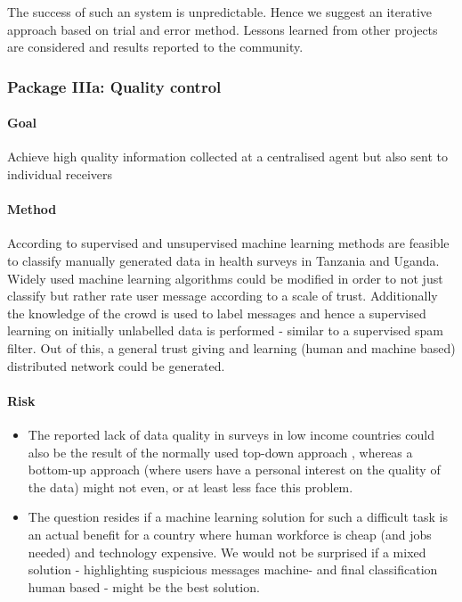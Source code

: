 \documentclass[11pt]{article}
\begin{document}
The success of such an system is unpredictable. Hence we suggest an iterative approach based on trial and error method. Lessons learned from other projects are considered and results reported to the community.



\subsubsection*{Package IIIa: Quality control}
\paragraph{Goal} Achieve high quality information collected at a centralised agent but also sent to individual receivers 
\paragraph{Method} According to \cite{birnbaum2012automated} supervised and unsupervised machine learning methods are feasible to classify manually generated data in health surveys in Tanzania and Uganda. Widely used machine learning algorithms could be modified in order to not just classify but rather rate user message according to a scale of trust. Additionally the knowledge of the crowd is used to label messages and hence a  supervised learning on initially unlabelled data is performed - similar to a supervised spam filter. Out of this, a general trust giving and learning (human and machine based) distributed network could be generated.

\paragraph{Risk}

\begin{itemize}
 \item The reported lack of data quality in surveys in low income countries could also be the result of the normally used top-down approach \cite{birnbaum2012automated}, whereas a bottom-up approach  (where users have a personal interest on the quality of the data) might not even, or at least less face this problem.
 \item The question resides if a machine learning solution for such a difficult task is an actual benefit for a country where human workforce is cheap (and jobs needed) and technology expensive. We would not be surprised if a mixed solution - highlighting suspicious messages machine- and final classification human based - might be the best solution.
\end{itemize}
\end{document}
